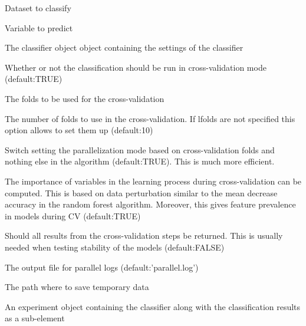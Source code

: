 \documentclass[a4paper]{book}
\begin{document}
\begin{Arguments}
\begin{ldescription}
\item[\code{X:}] Dataset to classify

\item[\code{y:}] Variable to predict

\item[\code{clf:}] The classifier object object containing the settings of the classifier

\item[\code{cross.validate:}] Whether or not the classification should be run in
cross-validation mode (default:TRUE)

\item[\code{lfolds:}] The folds to be used for the cross-validation

\item[\code{nfolds:}] The number of folds to use in the cross-validation. If lfolds
are not specified this option allows to set them up (default:10)

\item[\code{parallelize.folds:}] Switch setting the parallelization mode based on
cross-validation folds and nothing else in the algorithm (default:TRUE).
This is much more efficient.

\item[\code{compute.importance:}] The importance of variables in the learning process
during cross-validation can be computed. This is based on data perturbation
similar to the mean decrease accuracy in the random forest algorithm. Moreover,
this gives feature prevalence in models during CV (default:TRUE)

\item[\code{return.all:}] Should all results from the cross-validation steps be
returned. This is usually needed when testing stability of the models
(default:FALSE)

\item[\code{log.file:}] The output file for parallel logs (default:'parallel.log')

\item[\code{path:}] The path where to save temporary data
\end{ldescription}
\end{Arguments}
%
\begin{Value}
An experiment object containing the classifier along with the
classification results as a sub-element
\end{Value}
\end{document}

